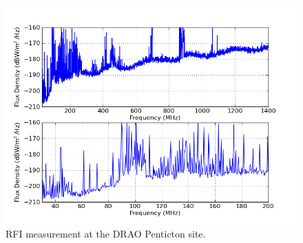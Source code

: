 \begin{figure}[htb]
\begin{center}
\includegraphics[width=0.95\linewidth]{RFI_testing/figures/DRAO_cal.png}
\caption{RFI measurement at the DRAO Penticton site. }
\label{Fig:draorfi}
\end{center}
\end{figure}



